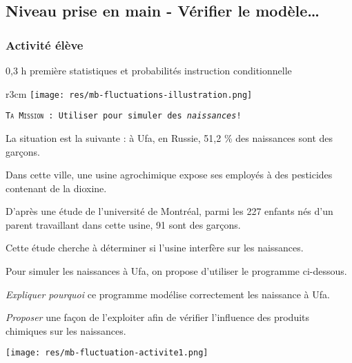%
%

\newpage

\subsection{Niveau prise en main - Vérifier le modèle\ldots}

\subsubsection{Activité élève}

\cartouche
{0,3 h}         %
{première}           %
{statistiques et probabilités}        %
{}     %
{instruction conditionnelle}       %


\begin{wrapfigure}{r}{3cm}
    \texttt{[image: res/mb-fluctuations-illustration.png]}
\end{wrapfigure}

\begin{eleve}
    \texttt{\textsc{Ta Mission} : Utiliser \mb pour simuler des \emph{naissances}!}

    La situation est la suivante : à Ufa, en Russie, 51,2 \%  des naissances sont des garçons.

    Dans cette ville, une usine agrochimique expose ses employés à des pesticides contenant de la dioxine.

    D’après une étude de l’université de Montréal, parmi les 227 enfants nés d’un parent travaillant dans cette usine, 91 sont des garçons.

    Cette étude cherche à déterminer si l’usine interfère sur les naissances.

    Pour simuler les naissances à Ufa, on propose d'utiliser le programme ci-dessous.

    \emph{Expliquer pourquoi} ce programme modélise correctement les naissance à Ufa.

    \emph{Proposer} une façon de l'exploiter afin de vérifier l'influence des produits chimiques sur les naissances.

    \texttt{[image: res/mb-fluctuation-activite1.png]}

\end{eleve}



